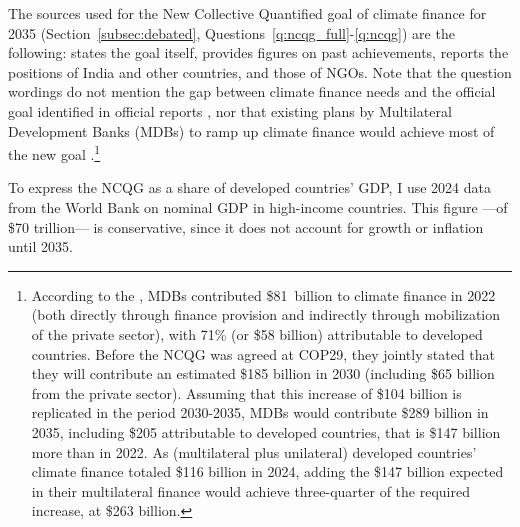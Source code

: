 The sources used for the New Collective Quantified goal of climate finance for 2035 (Section~\ref{subsec:debated}, Questions~\ref{q:ncqg_full}-\ref{q:ncqg}) are the following: \cite{unfccc_new_2024} states the goal itself, \cite{oecd_climate_2024} provides figures on past achievements, \cite{earth_negotiations_bulletin_daily_2024} reports the positions of India and other countries, and \cite{climate_action_network_climate_2024,demand_climate_justice_engo-demand_2025} those of NGOs. Note that the question wordings do not mention the gap between climate finance needs and the official goal identified in official reports \citep{oecd_bridging_2024,songwe_raising_2024}, nor that existing plans by Multilateral Development Banks (MDBs) to ramp up climate finance would achieve most of the new goal \citep{mdbs_joint_2024}.\footnote{According to the  \cite{oecd_climate_2024}, MDBs contributed \$81~billion to climate finance in 2022 (both directly through finance provision and indirectly through mobilization of the private sector), with 71\% (or \$58 billion) attributable to developed countries. Before the NCQG was agreed at COP29, they jointly stated that they will contribute an estimated \$185 billion in 2030 (including \$65 billion from the private sector). Assuming that this increase of \$104 billion is replicated in the period 2030-2035, MDBs would contribute \$289 billion in 2035, including \$205 attributable to developed countries, that is \$147 billion more than in 2022. As (multilateral plus unilateral) developed countries' climate finance totaled \$116 billion in 2024, adding the \$147 billion expected in their multilateral finance would achieve three-quarter of the required increase, at \$263 billion.}

To express the NCQG as a share of developed countries' GDP, I use 2024 data from the World Bank on nominal GDP in high-income countries. This figure ---of \$70 trillion--- is conservative, since it does not account for growth or inflation until 2035.

